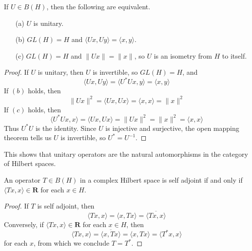 \begin{theorem}
    If $U \in B(H)$, then the following are equivalent.
    \begin{enumerate}
        \item[(a)] $U$ is unitary.
        \item[(b)] $GL(H) = H$ and $\langle Ux, Uy \rangle = \langle x, y \rangle$.
        \item[(c)] $GL(H) = H$ and $\| Ux \| = \| x \|$, so $U$ is an isometry from $H$ to itself.
    \end{enumerate}
\end{theorem}
\begin{proof}
    If $U$ is unitary, then $U$ is invertible, so $GL(H) = H$, and
    \[ \langle Ux, Uy \rangle = \langle U^*Ux, y \rangle = \langle x, y \rangle \]
    If $(b)$ holds, then
    \[ \| Ux \|^2 = \langle Ux, Ux \rangle = \langle x, x \rangle = \| x \|^2 \]
    If $(c)$ holds, then
    \[ \langle U^*Ux, x \rangle = \langle Ux, Ux \rangle = \|Ux\|^2 = \|x\|^2 = \langle x, x \rangle \]
    Thus $U^*U$ is the identity. Since $U$ is injective and surjective, the open mapping theorem tells us $U$ is invertible, so $U^* = U^{-1}$.
\end{proof}

This shows that unitary operators are the natural automorphisms in the category of Hilbert spaces.

\begin{lemma}
    An operator $T \in B(H)$ in a complex Hilbert space is self adjoint if and only if $\langle Tx, x \rangle \in \mathbf{R}$ for each $x \in H$.
\end{lemma}
\begin{proof}
    If $T$ is self adjoint, then
    \[ \langle Tx, x \rangle = \langle x, Tx \rangle = \overline{\langle Tx, x \rangle} \]
    Conversely, if $\langle Tx, x \rangle \in \mathbf{R}$ for each $x \in H$, then
    \[ \langle Tx, x \rangle = \overline{\langle x, Tx \rangle} = \langle x, Tx \rangle = \langle T^*x, x \rangle \]
    for each $x$, from which we conclude $T = T^*$.
\end{proof}

